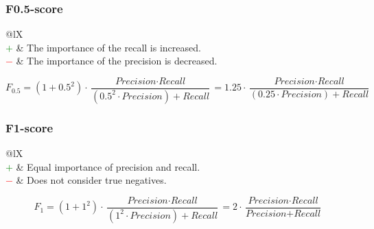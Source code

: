 \documentclass{article}
\begin{document}
\subsubsection[F0.5-score]{F0.5-score \cite{van2004geometry, taha2015metrics}}

\begin{table}[H]\centering
    \begin{tabularx}{\textwidth}{@{}lX}
         \\
        \textcolor{Green}{$+$} & The importance of the recall is increased. \\
        \textcolor{Red}{$-$}   & The importance of the precision is decreased.
    \end{tabularx}
\end{table}

\begin{equation}
    F_{0.5} = (1 + 0.5^2) \cdot \dfrac{\textit{Precision} \cdot \textit{Recall}}{(0.5^2 \cdot \textit{Precision}) + \textit{Recall}} = 1.25 \cdot \dfrac{\textit{Precision} \cdot \textit{Recall}}{(0.25 \cdot \textit{Precision}) + \textit{Recall}}
%
    \label{equation:F0.5-score}
\end{equation}


\subsubsection[F1-score]{F1-score \cite{van2004geometry, taha2015metrics}}

\begin{table}[H]\centering
    \begin{tabularx}{\textwidth}{@{}lX}
         \\
        \textcolor{Green}{$+$} & Equal importance of precision and recall. \\
        \textcolor{Red}{$-$}   & Does not consider true negatives.
    \end{tabularx}
\end{table}

\begin{equation}
    F_1 = (1 + 1^2) \cdot \dfrac{\textit{Precision} \cdot \textit{Recall}}{(1^2 \cdot \textit{Precision}) + \textit{Recall}} = 2 \cdot \dfrac{\textit{Precision} \cdot \textit{Recall}}{\textit{Precision} + \textit{Recall}}
%
    \label{equation:F1-score}
\end{equation}
\end{document}
